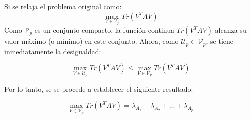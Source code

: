 Si se relaja el problema original como:
\begin{equation} \label{A1:2}
	\max_{V \in \mathcal{V}_p} Tr(V^T A V)
\end{equation}
Como $\mathcal{V}_p$ es un conjunto compacto, la función continua $Tr(V^T AV)$ alcanza su valor máximo (o mínimo) en este conjunto. Ahora, como $\mathcal{U}_p \subset \mathcal{V}_p$, se tiene inmediatamente la desigualdad:

\begin{equation} \label{A1:3}
\max_{V \in \mathcal{U}_p} Tr(V^T A V) \leq \max_{V \in \mathcal{V}_p} Tr(V^T AV)	
\end{equation}

Por lo tanto, se se procede a establecer el siguiente resultado:

\begin{theorem}\label{A1:T1}
\begin{equation*}
	\max_{V \in \mathcal{V}_p} Tr(V^T A V) = \lambda_{A_1} + \lambda_{A_2} + ... + \lambda_{A_p}
\end{equation*}
\end{theorem}

